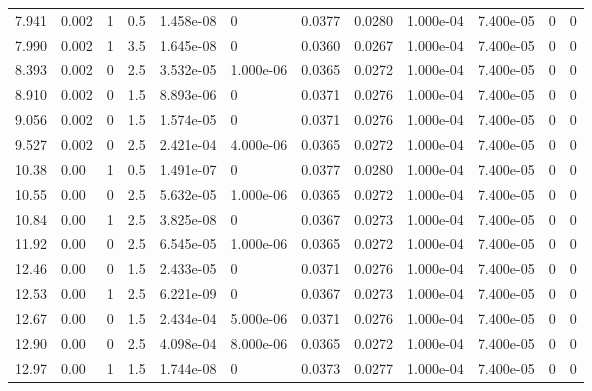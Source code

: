 \documentclass[preview]{standalone}
\begin{document}
{{\begin{tabular}{L{1.2cm}C{1.2cm} C{0.3cm}C{0.5cm} C{1.4cm}C{1.4cm} C{1.4cm}C{1.4cm} C{1.6cm}C{1.6cm} C{1.6cm}C{1.6cm}}
  7.941  &  0.002  & 1     & 0.5 &  1.458e-08  & 0  &  0.0377&   0.0280& 1.000e-04 & 7.400e-05   &  0 & 0  \\ 
  7.990  &  0.002  & 1     & 3.5 &  1.645e-08  & 0  &  0.0360&   0.0267& 1.000e-04 & 7.400e-05   &  0 & 0  \\ 
  8.393  &  0.002  & 0     & 2.5 &  3.532e-05  & 1.000e-06  &  0.0365&   0.0272& 1.000e-04 & 7.400e-05   &  0 & 0  \\ 
  8.910  &  0.002  & 0     & 1.5 &  8.893e-06  & 0  &  0.0371&   0.0276& 1.000e-04 & 7.400e-05   &  0 & 0  \\ 
  9.056  &  0.002  & 0     & 1.5 &  1.574e-05  & 0  &  0.0371&   0.0276& 1.000e-04 & 7.400e-05   &  0 & 0  \\ 
  9.527  &  0.002  & 0     & 2.5 &  2.421e-04  & 4.000e-06  &  0.0365&   0.0272& 1.000e-04 & 7.400e-05   &  0 & 0  \\ 
  10.38  &  0.00  & 1     & 0.5 &  1.491e-07  & 0  &  0.0377&   0.0280& 1.000e-04 & 7.400e-05   &  0 & 0  \\ 
  10.55  &  0.00  & 0     & 2.5 &  5.632e-05  & 1.000e-06  &  0.0365&   0.0272& 1.000e-04 & 7.400e-05   &  0 & 0  \\ 
  10.84  &  0.00  & 1     & 2.5 &  3.825e-08  & 0  &  0.0367&   0.0273& 1.000e-04 & 7.400e-05   &  0 & 0  \\ 
  11.92  &  0.00  & 0     & 2.5 &  6.545e-05  & 1.000e-06  &  0.0365&   0.0272& 1.000e-04 & 7.400e-05   &  0 & 0  \\ 
  12.46  &  0.00  & 0     & 1.5 &  2.433e-05  & 0  &  0.0371&   0.0276& 1.000e-04 & 7.400e-05   &  0 & 0  \\ 
  12.53  &  0.00  & 1     & 2.5 &  6.221e-09  & 0  &  0.0367&   0.0273& 1.000e-04 & 7.400e-05   &  0 & 0  \\ 
  12.67  &  0.00  & 0     & 1.5 &  2.434e-04  & 5.000e-06  &  0.0371&   0.0276& 1.000e-04 & 7.400e-05   &  0 & 0  \\ 
  12.90  &  0.00  & 0     & 2.5 &  4.098e-04  & 8.000e-06  &  0.0365&   0.0272& 1.000e-04 & 7.400e-05   &  0 & 0  \\ 
  12.97  &  0.00  & 1     & 1.5 &  1.744e-08  & 0  &  0.0373&   0.0277& 1.000e-04 & 7.400e-05   &  0 & 0  \\ 
\hline 
\end{tabular} 

}}
\end{document}
